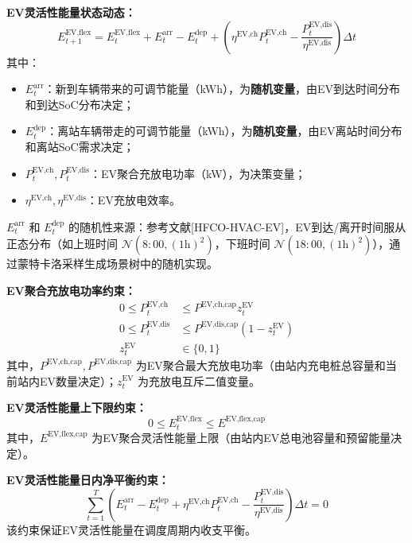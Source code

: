 \documentclass[11pt]{ctexart}
\begin{document}
\textbf{EV灵活性能量状态动态：}
\begin{equation}
E_{t+1}^{\text{EV,flex}} = E_{t}^{\text{EV,flex}} + E_{t}^{\text{arr}} - E_{t}^{\text{dep}} + \left( \eta^{\text{EV,ch}} P_{t}^{\text{EV,ch}} - \frac{P_{t}^{\text{EV,dis}}}{\eta^{\text{EV,dis}}} \right) \Delta t
\end{equation}
其中：
\begin{itemize}[leftmargin=2em, itemsep=2pt, topsep=2pt]
    \item $E_{t}^{\text{arr}}$：新到车辆带来的可调节能量（kWh），为\textbf{随机变量}，由EV到达时间分布和到达SoC分布决定；
    \item $E_{t}^{\text{dep}}$：离站车辆带走的可调节能量（kWh），为\textbf{随机变量}，由EV离站时间分布和离站SoC需求决定；
    \item $P_{t}^{\text{EV,ch}}, P_{t}^{\text{EV,dis}}$：EV聚合充放电功率（kW），为决策变量；
    \item $\eta^{\text{EV,ch}}, \eta^{\text{EV,dis}}$：EV充放电效率。
\end{itemize}

$E_{t}^{\text{arr}}$ 和 $E_{t}^{\text{dep}}$ 的随机性来源：参考文献{[HFCO-HVAC-EV]}，EV到达/离开时间服从正态分布（如上班时间 $\mathcal{N}(8{:}00, (1\text{h})^2)$，下班时间 $\mathcal{N}(18{:}00, (1\text{h})^2)$），通过蒙特卡洛采样生成场景树中的随机实现。

\textbf{EV聚合充放电功率约束：}
\begin{align}
0 \le P_{t}^{\text{EV,ch}} & \le P^{\text{EV,ch,cap}} z_{t}^{\text{EV}} \\
0 \le P_{t}^{\text{EV,dis}} & \le P^{\text{EV,dis,cap}} (1 - z_{t}^{\text{EV}}) \\
z_{t}^{\text{EV}} & \in \{0, 1\}
\end{align}
其中，$P^{\text{EV,ch,cap}}, P^{\text{EV,dis,cap}}$ 为EV聚合最大充放电功率（由站内充电桩总容量和当前站内EV数量决定）；$z_{t}^{\text{EV}}$ 为充放电互斥二值变量。

\textbf{EV灵活性能量上下限约束：}
\begin{equation}
0 \le E_{t}^{\text{EV,flex}} \le E^{\text{EV,flex,cap}}
\end{equation}
其中，$E^{\text{EV,flex,cap}}$ 为EV聚合灵活性能量上限（由站内EV总电池容量和预留能量决定）。

\textbf{EV灵活性能量日内净平衡约束：}
\begin{equation}
\sum_{t=1}^{T} \left( E_{t}^{\text{arr}} - E_{t}^{\text{dep}} + \eta^{\text{EV,ch}} P_{t}^{\text{EV,ch}} - \frac{P_{t}^{\text{EV,dis}}}{\eta^{\text{EV,dis}}} \right) \Delta t = 0
\end{equation}
该约束保证EV灵活性能量在调度周期内收支平衡。
\end{document}
